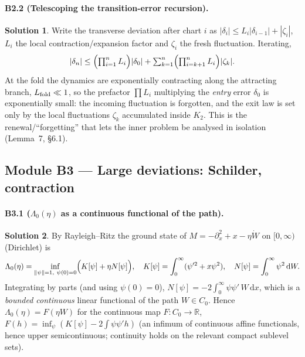\documentclass[11pt]{article}
\newcommand{\R}{\mathbb{R}}
\newcommand{\dd}{\mathrm{d}}
\newcommand{\Lam}{\Lambda_0}
\theoremstyle{definition}
\newtheorem*{sol}{Solution}
\begin{document}
\paragraph{B2.2 (Telescoping the transition-error recursion).}
\begin{sol}
Write the transverse deviation after chart $i$ as $|\delta_i|\le L_i|\delta_{i-1}|+|\zeta_i|$,
$L_i$ the local contraction/expansion factor and $\zeta_i$ the fresh fluctuation. Iterating,
\[
|\delta_n|\le\Bigl(\textstyle\prod_{i=1}^n L_i\Bigr)|\delta_0|
+\sum_{k=1}^n\Bigl(\textstyle\prod_{i=k+1}^n L_i\Bigr)|\zeta_k|.
\]
At the fold the dynamics are exponentially contracting along the attracting branch, $L_{\rm fold}\ll1$,
so the prefactor $\prod L_i$ multiplying the \emph{entry} error $\delta_0$ is exponentially small:
the incoming fluctuation is forgotten, and the exit law is set only by the local fluctuations
$\zeta_k$ accumulated inside $K_2$. This is the renewal/``forgetting'' that lets the inner
problem be analysed in isolation (Lemma~7, \S6.1).
\end{sol}

\subsection*{Module B3 --- Large deviations: Schilder, contraction}

\paragraph{B3.1 ($\Lam(\eta)$ as a continuous functional of the path).}
\begin{sol}
By Rayleigh--Ritz the ground state of $M=-\partial_x^2+x-\eta\dot W$ on $[0,\infty)$ (Dirichlet)
is
\[
\Lam(\eta)=\inf_{\|\psi\|=1,\ \psi(0)=0}\Bigl(K[\psi]+\eta N[\psi]\Bigr),\quad
K[\psi]=\int_0^\infty(\psi'^2+x\psi^2),\quad N[\psi]=\int_0^\infty\psi^2\,\dd W.
\]
Integrating by parts (and using $\psi(0)=0$), $N[\psi]=-2\int_0^\infty\psi\psi'\,W\,\dd x$, which
is a \emph{bounded continuous} linear functional of the path $W\in C_0$. Hence
$\Lam(\eta)=F(\eta W)$ for the continuous map $F:C_0\to\R$, $F(h)=\inf_\psi(K[\psi]-2\int\psi\psi'h)$
(an infimum of continuous affine functionals, hence upper semicontinuous; continuity holds on the
relevant compact sublevel sets).
\end{sol}
\end{document}
